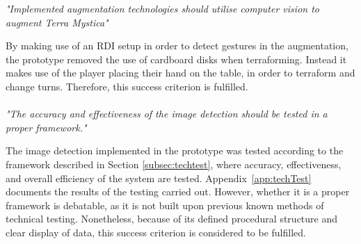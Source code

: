 \textit{"Implemented augmentation technologies should utilise computer vision to augment Terra Mystica"}

By making use of an RDI setup in order to detect gestures in the augmentation, the prototype removed the use of cardboard disks when terraforming. Instead it makes use of the player placing their hand on the table, in order to terraform and change turns. Therefore, this success criterion is fulfilled.\\
\\

\textit{"The accuracy and effectiveness of the image detection should be tested in a proper framework."}

The image detection implemented in the prototype was tested according to the framework described in Section \ref{subsec:techtest}, where accuracy, effectiveness, and overall efficiency of the system are tested. Appendix~\ref{app:techTest} documents the results of the testing carried out. However, whether it is a proper framework is debatable, as it is not built upon previous known methods of technical testing. Nonetheless, because of its defined procedural structure and clear display of data, this success criterion is considered to be fulfilled.